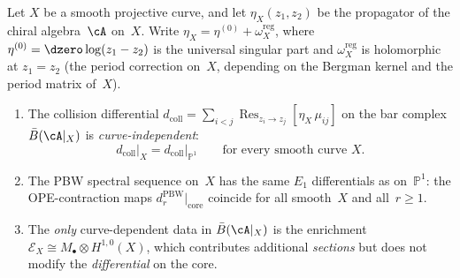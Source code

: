 \begin{proposition}\label{prop:collision-locality}
Let $X$ be a smooth projective curve, and let
$\eta_X(z_1,z_2)$ be the propagator of the chiral
algebra~$\cA$ on~$X$.  Write
$\eta_X = \eta^{(0)} + \omega_X^{\mathrm{reg}}$,
where $\eta^{(0)} = \dzero\log(z_1-z_2)$ is the
universal singular part and
$\omega_X^{\mathrm{reg}}$ is holomorphic at
$z_1 = z_2$ \textup{(}the period correction on~$X$,
depending on the Bergman kernel and the period
matrix of~$X$\textup{)}.

\begin{enumerate}[label=\textup{(\roman*)}]
\item The collision differential
  $d_{\mathrm{coll}} =
  \sum_{i<j}\operatorname{Res}_{z_i \to z_j}
  [\eta_X\,\mu_{ij}]$
  on the bar complex $\bar{B}(\cA|_X)$
  is \emph{curve-independent}:
  \[
  d_{\mathrm{coll}}\big|_X
  = d_{\mathrm{coll}}\big|_{\mathbb{P}^1}
  \qquad \text{for every smooth curve }X.
  \]
\item The PBW spectral sequence on~$X$ has the same
  $E_1$ differentials as on~$\mathbb{P}^1$: the
  OPE-contraction maps
  $d_r^{\mathrm{PBW}}\big|_{\mathrm{core}}$
  coincide for all smooth~$X$ and all~$r \geq 1$.
\item The \emph{only} curve-dependent data in
  $\bar{B}(\cA|_X)$ is the enrichment
  $\mathcal{E}_X \cong
  M_\bullet \otimes H^{1,0}(X)$, which contributes
  additional \emph{sections} but does not modify
  the \emph{differential} on the core.
\end{enumerate}
\end{proposition}

